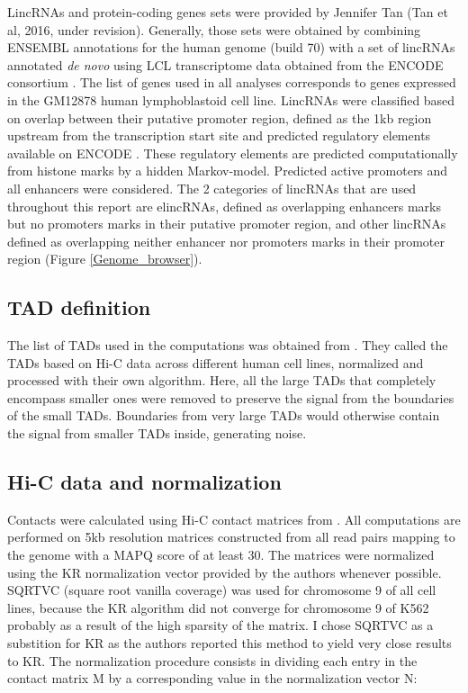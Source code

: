 \documentclass[11pt,a4paper]{report}
\begin{document}
LincRNAs and protein-coding genes sets were provided by Jennifer Tan (Tan et al, 2016, under revision). Generally, those sets were obtained by combining ENSEMBL annotations for the human genome (build 70) with a set of lincRNAs annotated \textit{de novo} using LCL transcriptome data obtained from the ENCODE consortium \cite{ENCODEProject2012}. The list of genes used in all analyses corresponds to genes expressed in the GM12878 human lymphoblastoid cell line. LincRNAs were classified based on overlap between their putative promoter region, defined as the 1kb region upstream from the transcription start site and predicted regulatory elements available on ENCODE \cite{ENCODEProject2012}⁠. These regulatory elements are predicted computationally from histone marks by a hidden Markov-model. Predicted active promoters and all enhancers were considered. The 2 categories of lincRNAs that are used throughout this report are elincRNAs, defined as overlapping enhancers marks but no promoters marks in their putative promoter region, and other lincRNAs defined as overlapping neither enhancer nor promoters marks in their promoter region (Figure \ref{Genome_browser}).



\subsection*{TAD definition}

The list of TADs used in the computations was obtained from \cite{Rao2014}. They called the TADs based on Hi-C data across different human cell lines, normalized and processed with their own algorithm. Here, all the large TADs that completely encompass smaller ones were removed to preserve the signal from the boundaries of the small TADs. Boundaries from very large TADs would otherwise contain the signal from smaller TADs inside, generating noise.

\subsection*{Hi-C data and normalization}

Contacts were calculated using Hi-C contact matrices from \cite{Rao2014}. All computations are performed on 5kb resolution matrices constructed from all read pairs mapping to the genome with a MAPQ score of at least 30. The matrices were normalized using the KR normalization vector provided by the authors whenever possible. SQRTVC (square root vanilla coverage) was used for chromosome 9 of all cell lines, because the KR algorithm did not converge for chromosome 9 of K562 probably as a result of the high sparsity of the matrix. I chose SQRTVC as a substition for KR as the authors reported this method  to yield very close results to KR. 
The normalization procedure consists in dividing each entry in the contact matrix M by a corresponding value in the normalization vector N:
\end{document}
